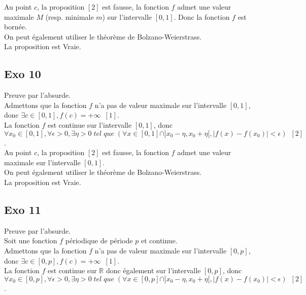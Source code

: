 \documentclass[]{book}
\theoremstyle{definition}
\newcommand{\bb}[1]{\mathbb{#1}}
\newcommand{\R}{\bb{R}}
\begin{document}
Au point $c$, la proposition $[2]$ est fausse, la fonction $f$ admet une valeur maximale $M$ (resp. minimale $m$) sur l'intervalle $[0,1]$. Donc la fonction $f$ est born\'ee.\\


On peut \'egalement utiliser le th\'eor\`eme de Bolzano-Weierstrass.\\

La proposition est Vraie.

\subsection*{Exo 10}
Preuve par l'absurde. \\

Admettons que la fonction $f$ n'a pas de valeur maximale sur l'intervalle $[0,1]$, donc $\exists c \in [0,1], f(c) = +\infty\,\,\,[1]$.\\

La fonction $f$ est continue sur l'intervalle $[0,1]$, donc $\forall x_0 \in [0,1], \forall \epsilon >0, \exists \eta > 0\; tel\; que\; (\forall x \in [0,1] \cap ]x_0-\eta, x_0+\eta[, |f(x)-f(x_0)| < \epsilon)\,\,\,[2]$. \\ 

Au point $c$, la proposition $[2]$ est fausse, la fonction $f$ admet une valeur maximale sur l'intervalle $[0,1]$.\\


On peut \'egalement utiliser le th\'eor\`eme de Bolzano-Weierstrass.\\

La proposition est Vraie.


\subsection*{Exo 11}
Preuve par l'absurde. \\

Soit une fonction $f$ p\'eriodique de p\'eriode $p$ et continue. \\

Admettons que la fonction $f$ n'a pas de valeur maximale sur l'intervalle $[0,p]$, donc $\exists c \in [0,p], f(c) = +\infty\,\,\,[1]$.\\

La fonction $f$ est continue sur $\R$ donc \'egalement sur l'intervalle $[0,p]$, donc $\forall x_0 \in [0,p], \forall \epsilon >0, \exists \eta > 0\; tel\; que\; (\forall x \in [0,p] \cap ]x_0-\eta, x_0+\eta[, |f(x)-f(x_0)| < \epsilon)\,\,\,[2]$. \\ 
\end{document}
